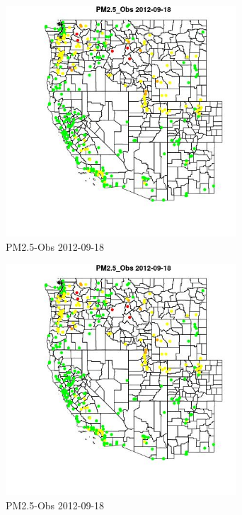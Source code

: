 \begin{figure} 
\centering  
\includegraphics[width=0.77\textwidth]{Code_Outputs/ML_input_report_ML_input_PM25_Step5_part_d_de_duplicated_aves_ML_input_MapObsPM25_Obs2012-09-18.jpg} 
\caption{\label{fig:ML_input_report_ML_input_PM25_Step5_part_d_de_duplicated_aves_ML_inputMapObsPM25_Obs2012-09-18}PM2.5-Obs 2012-09-18} 
\end{figure} 
 

\begin{figure} 
\centering  
\includegraphics[width=0.77\textwidth]{Code_Outputs/ML_input_report_ML_input_PM25_Step5_part_d_de_duplicated_aves_ML_input_MapObsPM25_Obs2012-09-18.jpg} 
\caption{\label{fig:ML_input_report_ML_input_PM25_Step5_part_d_de_duplicated_aves_ML_inputMapObsPM25_Obs2012-09-18}PM2.5-Obs 2012-09-18} 
\end{figure} 
 

